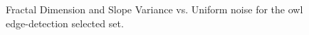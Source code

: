 \documentclass[12pt, oneside]{book}
\begin{document}
\begin{figure}[!b]
  \centering
  \caption[Fractal Dimension and Slope Variance vs. Uniform noise for the owl edge-detection selected set]{Fractal Dimension and Slope Variance vs. Uniform noise for the owl edge-detection selected set.}
  \label{fig:owl-ed_multi_uniform_result}
\end{figure}
\end{document}
